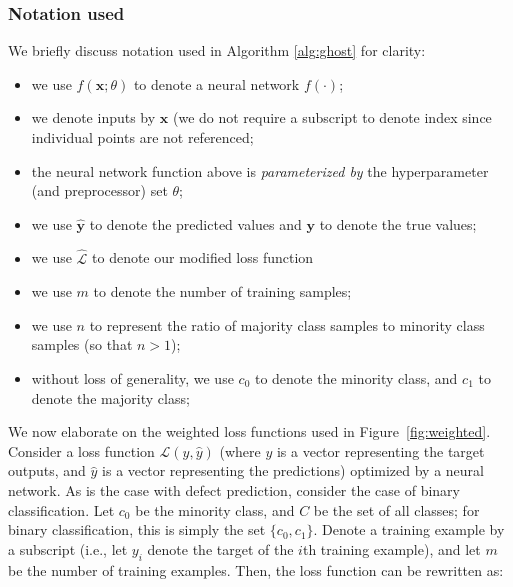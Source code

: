 \documentclass[10pt,compsoc,twocolumn]{IEEEtran}
\newcommand{\respto}[1]{
\fcolorbox{black}{black!15}{%
\label{resp:#1}%
\bf\scriptsize R{#1}}}
\newcommand{\BLACK}{\color{black}}
\begin{document}
\subsubsection{Notation used}
\label{sec:notation}
We briefly discuss notation used in Algorithm \ref{alg:ghost} for clarity:  \respto{2a6.1}
\begin{itemize}
    \item we use $f(\textbf{x}; \theta)$ to denote a neural network $f(\cdot)$;
    \item we denote inputs by $\textbf{x}$ (we do not require a subscript to denote index since individual points are not referenced;
    \item the neural network function above is \textit{parameterized by} the hyperparameter (and preprocessor) set $\theta$;
    \item we use $\hat{\textbf{y}}$ to denote the predicted values and $\textbf{y}$ to denote the true values;
    \item we use $\hat{\mathcal{L}}$ to denote our modified loss function
    \item we use $m$ to denote the number of training samples;
    \item we use $n$ to represent the ratio of majority class samples to minority class samples (so that $n > 1$);
    \item without loss of generality, we use $c_0$ to denote the minority class, and $c_1$ to denote the majority class;
\end{itemize}
\BLACK
 

We now elaborate on the weighted loss functions used in
Figure~\ref{fig:weighted}.  Consider a loss function $\mathcal{L}(y, \hat{y})$ (where $y$ is a vector representing the target outputs, and $\hat{y}$ is a vector representing the predictions) optimized by a neural network. As is the case with defect prediction, consider the case of binary classification. Let $c_0$ be the minority class, and $C$ be the set of all classes; for binary classification, this is simply the set $\{c_0, c_1\}$. Denote a training example by a subscript (i.e., let $y_i$ denote the target of the $i$th training example), and let $m$ be the number of training examples. Then, the loss function can be rewritten as:
\end{document}
